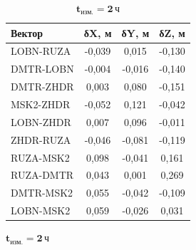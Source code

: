 \begin{table} [htbp]
	\centering\small
	\label{tab:tab40}{
		\begin{subtable}{.47\linewidth}	
			\centering
			\caption*{$\mathbf{t_\text{изм.}=1\,\text{ч}}$}
			\begin{tabular}{ l
					S[table-number-alignment = center]
					S[table-number-alignment = center]
					S[table-number-alignment = center] }
				
				
				\hline
				\textbf{Вектор}				& \textbf{δX, м}	& \textbf{δY, м}	& \textbf{δZ, м}	\\ \hline
				LOBN-RUZA					&     -0,039		& 	   0,015		&     -0,130		\\ %
				DMTR-LOBN					&     -0,004		&     -0,016		&     -0,140		\\ %
				DMTR-ZHDR					&      0,003		&      0,080		&     -0,151		\\ %
				MSK2-ZHDR					&     -0,052		&      0,121		&     -0,042		\\ %
				LOBN-ZHDR					&      0,007		&      0,096		&     -0,011		\\ %
				ZHDR-RUZA					&     -0,046		&     -0,081		&     -0,119		\\ %
				RUZA-MSK2					&      0,098		&     -0,041		&      0,161		\\ %
				RUZA-DMTR					&      0,043		&      0,001		&      0,269		\\ %
				DMTR-MSK2					&      0,055		&     -0,042		&     -0,109		\\ %
				LOBN-MSK2					&      0,059		&     -0,026		&      0,031		\\ \hline
				
			\end{tabular}
		\end{subtable}%
		\qquad%
		\begin{subtable}{.47\linewidth}	
			\centering
			\caption*{$\mathbf{t_\text{изм.}=2\,\text{ч}}$}
			\begin{tabular}{ l
					S[table-number-alignment = center]
					S[table-number-alignment = center]
					S[table-number-alignment = center] }
				

\end{tabular}
\end{subtable}}
\end{table}

